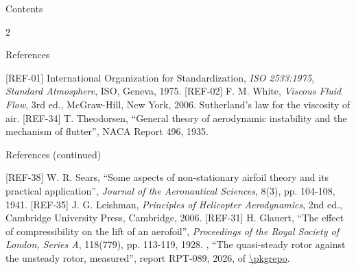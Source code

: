 \documentclass[aspectratio=169,11pt]{beamer}
\begin{document}
\begin{frame}{Contents}
\begin{multicols}{2}
\tableofcontents
\end{multicols}
\end{frame}









\begin{frame}{References}
\begin{reflist}
   
   
   \recordsref
   
   
   
   [REF-01] International Organization for Standardization, \emph{ISO
        2533:1975, Standard Atmosphere}, ISO, Geneva, 1975.
   [REF-02] F. M. White, \emph{Viscous Fluid Flow}, 3rd ed., McGraw-Hill, New
        York, 2006. Sutherland's law for the viscosity of air.
   \smiref
   [REF-34] T. Theodorsen, ``General theory of aerodynamic instability and the
        mechanism of flutter'', NACA Report 496, 1935.
\end{reflist}
\end{frame}

\begin{frame}{References (continued)}
\begin{reflist}
  \setcounter{enumi}{10}
   [REF-38] W. R. Sears, ``Some aspects of non-stationary airfoil theory and its
        practical application'', \emph{Journal of the Aeronautical Sciences},
        8(3), pp. 104-108, 1941.
   [REF-35] J. G. Leishman, \emph{Principles of Helicopter Aerodynamics}, 2nd
        ed., Cambridge University Press, Cambridge, 2006.
   [REF-31] H. Glauert, ``The effect of compressibility on the lift of an
        aerofoil'', \emph{Proceedings of the Royal Society of London, Series
        A}, 118(779), pp. 113-119, 1928.
   \pkgauthor, ``The quasi-steady rotor against the unsteady rotor,
        measured'', report RPT-089, 2026,  of \url{\pkgrepo}.
\end{reflist}
\end{frame}
\end{document}
